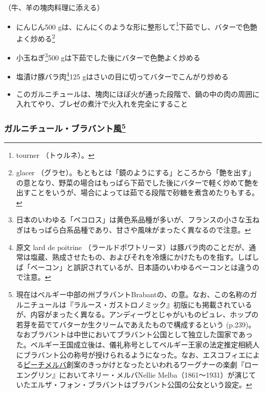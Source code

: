 \begin{recette}


（牛、羊の塊肉料理に添える）

\begin{itemize}
\item
  にんじん500 gは、にんにくのような形に整形して\footnote{tourner
    （トゥルネ）。}下茹でし、バターで色艶よく炒める\footnote{glacer
    （グラセ）。もともとは「鏡のようにする」ところから「艶を出す」の意となり、野菜の場合はもっぱら下茹でした後にバターで軽く炒めて艶を出すことをいうが、場合によっては茹でる段階で砂糖を煮含めたりもする。}
\item
  小玉ねぎ\footnote{日本のいわゆる「ペコロス」は黄色系品種が多いが、フランスの小さな玉ねぎはもっぱら白系品種であり、甘さや風味がまったく異なるので注意。}500
  gは下茹でした後にバターで色艶よく炒める
\item
  塩漬け豚バラ肉\footnote{原文 lard de poitrine
    （ラールドポワトリーヌ）は豚バラ肉のことだが、通常は塩蔵、熟成させたもの、およびそれを冷燻にかけたものを指す。しばしば「ベーコン」と誤訳されているが、日本語のいわゆるベーコンとは違うので注意。}125
  gはさいの目に切ってバターでこんがり炒める
\item
  このガルニチュールは、塊肉にほぼ火が通った段階で、鍋の中の肉の周囲に入れてやり、ブレゼの煮汁で火入れを完全にすること
\end{itemize}

\hypertarget{garniture-brabanconne}{%
\subsubsection[ガルニチュール・ブラバント風]{\texorpdfstring{ガルニチュール・ブラバント風\footnote{現在はベルギー中部の州ブラバントBrabantの、の意。なお、この名称のガルニチュールは『ラルース・ガストロノミック』初版にも掲載されているが、内容がまったく異なる。アンディーヴとじゃがいものピュレ、ホップの若芽を茹でてバターか生クリームであえたもので構成するという
  (p.239)。なおブラバントは中世においてブラバント公国として独立した国家であった。ベルギー王国成立後は、儀礼称号としてベルギー王家の法定推定相続人にブラバント公の称号が授けられるようになった。なお、エスコフィエによる\protect\hyperlink{peches-melba}{ピーチメルバ}創案のきっかけとなったといわれるワーグナーの楽劇『ローエングリン』においてネリー・メルバNellie
  Melba（1861〜1931）が演じていたエルザ・フォン・ブラバントはブラバント公国の公女という設定。}}{ガルニチュール・ブラバント風}}\label{garniture-brabanconne}}


\end{recette}
